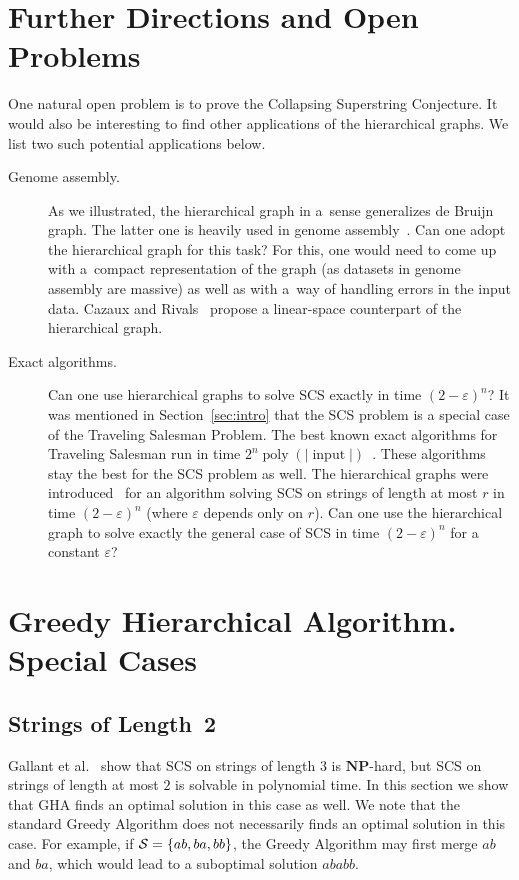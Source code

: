 \documentclass[11pt]{article}
\DeclareMathOperator{\poly}{poly}
\DeclareMathOperator{\inp}{input}
\begin{document}
\section{Further Directions and Open Problems}
One natural open problem is to prove the Collapsing Superstring Conjecture.
It would also be interesting to find other applications of the 
hierarchical graphs. We list two such potential applications below.
\begin{description}
\item[Genome assembly.] As we illustrated, the hierarchical graph in a~sense
generalizes de Bruijn graph. The latter one is heavily used
in genome assembly~\cite{pevzner2001eulerian}.
Can one adopt the hierarchical graph for this task? For this, one
would need to come up with a~compact representation of the graph
(as datasets in genome assembly are massive) as well as with a~way of
handling errors in the input data. Cazaux and Rivals~\cite{cazaux2018hierarchical} propose a linear-space counterpart of the hierarchical graph.

\item[Exact algorithms.] Can one use hierarchical graphs to solve SCS exactly in time $(2-\varepsilon)^n$?
It was mentioned in Section~\ref{sec:intro} that the SCS problem is a special case of the Traveling Salesman Problem. The best known exact algorithms for Traveling Salesman run in time $2^n \poly(|\inp|)$~\cite{B1962, HK1971, KGK1977, K1982, BF1996}. These algorithms stay the best for the SCS problem as well. The hierarchical graphs were introduced~\cite{scs_exact} for an algorithm solving SCS on strings of length at most $r$ in time $(2-\varepsilon)^n$ (where $\varepsilon$ depends only on $r$). Can one use the hierarchical graph to solve exactly the general case of SCS in time $(2-\varepsilon)^n$ for a constant $\varepsilon$?
\end{description}




\appendix
\section{Greedy Hierarchical Algorithm. Special Cases}
\label{app:a}
\subsection{Strings of Length~2}
Gallant et al.~\cite{GMS1980} show that SCS on strings of length $3$ is $\mathbf{NP}$-hard, but SCS on strings of length at most $2$ is solvable in polynomial time. In this section we show that GHA finds an optimal solution in this case as well. We note that the standard Greedy Algorithm does not necessarily finds an optimal solution in this case. For example, if ${\cal S}=\{ab, ba, bb\}$, the Greedy Algorithm may first merge $ab$ and $ba$, which would lead to a suboptimal solution $ababb$. 
\end{document}
